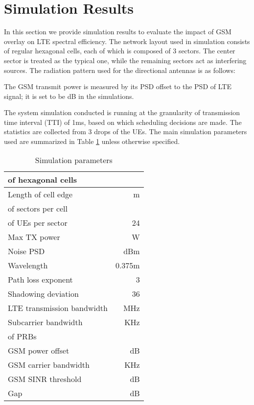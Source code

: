 \documentclass[10pt,journal]{IEEEtran}
\theoremstyle{slplain}
\begin{document}
\section{Simulation Results}
\label{sec:sim}

In this section we provide simulation results to evaluate the impact of GSM overlay on LTE spectral efficiency. The network layout used in simulation consists of regular hexagonal cells, each of which is composed of 3 sectors.
The center sector is treated as the typical one, while the remaining sectors act as interfering sources. The radiation pattern used for the directional antennas is as follows:

The GSM transmit power is measured by its PSD offset to the PSD of LTE signal; it is set to be dB in the simulations.



The system simulation conducted is running at the granularity of transmission time interval (TTI) of 1ms, based on which scheduling decisions are made. The statistics are collected from 3 drops of the UEs.
The main simulation parameters used are summarized in Table \ref{tab:sys:para} unless otherwise specified.
\begin{table}
\centering
\begin{tabular}{|l||r|} \hline
 of hexagonal cells &   \\ \hline
Length of cell edge  & m  \\ \hline
 of sectors per cell &   \\ \hline
 of UEs per sector   & 24  \\ \hline \hline
Max TX power & W \\ \hline
Noise PSD & dBm \\ \hline
Wavelength  & 0.375m \\ \hline
Path loss exponent  & 3 \\ \hline
Shadowing deviation  & 36 \\ \hline \hline
LTE transmission bandwidth & MHz \\ \hline
Subcarrier bandwidth  & KHz \\ \hline
 of PRBs &  \\ \hline \hline
GSM power offset & dB \\ \hline
GSM carrier bandwidth & KHz \\ \hline
GSM SINR threshold  & dB \\ \hline \hline
Gap  & dB \\ \hline
\end{tabular}
\caption{Simulation parameters}
\label{tab:sys:para}
\end{table}
\end{document}
